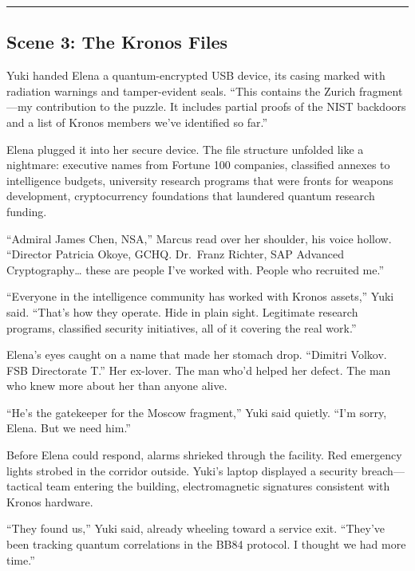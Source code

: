 \begin{center}\rule{0.5\linewidth}{0.5pt}\end{center}

\hypertarget{scene-3-the-kronos-files}{%
\subsection{Scene 3: The Kronos Files}\label{scene-3-the-kronos-files}}

Yuki handed Elena a quantum-encrypted USB device, its casing marked with
radiation warnings and tamper-evident seals. ``This contains the Zurich
fragment---my contribution to the puzzle. It includes partial proofs of
the NIST backdoors and a list of Kronos members we've identified so
far.''

Elena plugged it into her secure device. The file structure unfolded
like a nightmare: executive names from Fortune 100 companies, classified
annexes to intelligence budgets, university research programs that were
fronts for weapons development, cryptocurrency foundations that
laundered quantum research funding.

``Admiral James Chen, NSA,'' Marcus read over her shoulder, his voice
hollow. ``Director Patricia Okoye, GCHQ. Dr.~Franz Richter, SAP Advanced
Cryptography\ldots{} these are people I've worked with. People who
recruited me.''

``Everyone in the intelligence community has worked with Kronos
assets,'' Yuki said. ``That's how they operate. Hide in plain sight.
Legitimate research programs, classified security initiatives, all of it
covering the real work.''

Elena's eyes caught on a name that made her stomach drop. ``Dimitri
Volkov. FSB Directorate T.'' Her ex-lover. The man who'd helped her
defect. The man who knew more about her than anyone alive.

``He's the gatekeeper for the Moscow fragment,'' Yuki said quietly.
``I'm sorry, Elena. But we need him.''

Before Elena could respond, alarms shrieked through the facility. Red
emergency lights strobed in the corridor outside. Yuki's laptop
displayed a security breach---tactical team entering the building,
electromagnetic signatures consistent with Kronos hardware.

``They found us,'' Yuki said, already wheeling toward a service exit.
``They've been tracking quantum correlations in the BB84 protocol. I
thought we had more time.''

